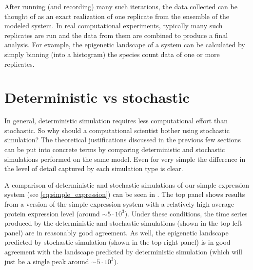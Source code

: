 After running (and recording) many such iterations, the data collected can be thought of as an exact realization of one replicate from the ensemble of the modeled system. In real computational experiments, typically many such replicates are run and the data from them are combined to produce a final analysis. For example, the epigenetic landscape of a system can be calculated by simply binning (\ie into a histogram) the species count data of one or more replicates.


\section{Deterministic vs stochastic}\label{sec:deterministic_vs_stochastic}

In general, deterministic simulation requires less computational effort than stochastic. So why should a computational scientist bother using stochastic simulation? The theoretical justifications discussed in the previous few sections can be put into concrete terms by comparing deterministic and stochastic simulations performed on the same model. Even for very simple  the difference in the level of detail captured by each simulation type is clear.

A comparison of deterministic and stochastic simulations of our simple expression system (see \eqref{eq:simple_expression}) can be seen in . The top panel shows results from a version of the simple expression system with a relatively high average protein expression level (around ${\sim}5 \cdot 10^{3}$). Under these conditions, the time series produced by the deterministic and stochastic simulations (shown in the top left panel) are in reasonably good agreement. As well, the epigenetic landscape predicted by stochastic simulation (shown in the top right panel) is in good agreement with the landscape predicted by deterministic simulation (which will just be a single peak around ${\sim}5 \cdot 10^{3}$). 

